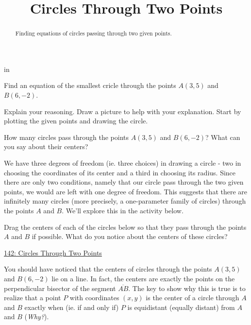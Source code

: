 \documentclass{ximera}
\title{Circles Through Two Points}
\newcommand{\pskip}{\vskip 0.1 in}
\begin{document}
\begin{abstract}
Finding equations of circles passing through two given points.
\end{abstract}
\maketitle


\pskip

\begin{question}\label{QLDF3efr}
Find an equation of the smallest cricle through the points $A(3,5)$ and $B(6,-2)$. 

Explain your reasoning. Draw a picture to help with your explanation. Start by plotting the given points and drawing the circle.
\end{question}

\begin{example}  \label{Ex5sdfdsfdsf}
How many circles pass through the points $A(3,5)$ and $B(6,-2)$? What can you say about their centers?

\begin{explanation}
We have three degrees of freedom (ie. three choices) in drawing a circle - two in choosing the coordinates of its center and a third in choosing its radius. Since there are only two conditions, namely that our circle pass through the two given points, we would are left with one degree of freedom. This suggests that there are infinitely many circles (more precisely, a one-parameter family of circles) through the points $A$ and $B$. We'll explore this in the activity below. 


Drag the centers of each of the circles below so that they pass through the points $A$ and $B$ if possible. What do you notice about the centers of these circles?
 
 
\begin{onlineOnly}
    \begin{center}
\end{center}
\end{onlineOnly}

\href{https://www.desmos.com/calculator/6lmpvfuqjk}{142: Circles Through Two Points}


You should have noticed that the centers of circles through the points $A(3,5)$ and $B(6,-2)$ lie on a line. In fact, the centers are exactly the points on the perpendicular bisector of the segment $\overline{AB}$. The key to show why this is true is to realize that a point $P$ with coordinates $(x,y)$ is the center of a circle through $A$ and $B$ exactly when (ie. if and only if) $P$ is equidistant (equally distant) from $A$ and $B$ (\emph{Why?}). 


\end{explanation}
\end{example}
\end{document}
